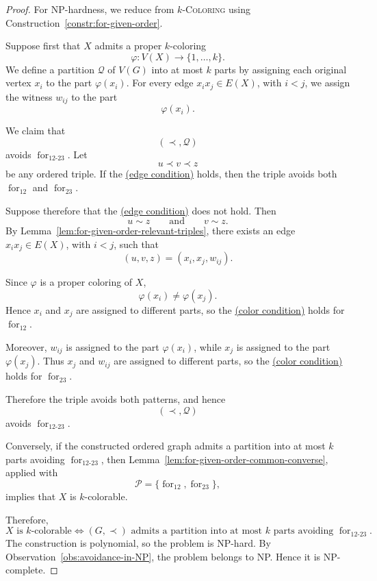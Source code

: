 \documentclass[12pt]{article}
\theoremstyle{plain}
\theoremstyle{definition}
\theoremstyle{remark}
\theoremstyle{definition}
\newcommand{\edgecondition}{%
  \hyperref[def:avoid:cond:edge]{(edge condition)}\xspace
}
\newcommand{\colorcondition}{%
  \hyperref[def:avoid:cond:color]{(color condition)}\xspace
}
\newcommand{\forlabel}{\mathrm{for}}
\DeclareRobustCommand{\forparam}[1]{%
  \ensuremath{\mathop{\forlabel}\nolimits_{#1}}%
}
\begin{document}
\begin{proof}
For NP-hardness, we reduce from \(k\)-\textsc{Coloring} using
Construction~\ref{constr:for-given-order}.

Suppose first that \(X\) admits a proper \(k\)-coloring
\[
\varphi:V(X)\to\{1,\dots,k\}.
\]
We define a partition \(\mathcal Q\) of \(V(G)\) into at most \(k\)
parts by assigning each original vertex \(x_i\) to the part
\(\varphi(x_i)\). For every edge \(x_ix_j\in E(X)\), with \(i<j\),
we assign the witness \(w_{ij}\) to the part
\[
\varphi(x_i).
\]

We claim that
\[
(\prec,\mathcal Q)
\]
avoids \(\forparam{12\text{-}23}\). Let
\[
u\prec v\prec z
\]
be any ordered triple. If the \edgecondition{} holds, then the triple
avoids both \(\forparam{12}\) and \(\forparam{23}\).

Suppose therefore that the \edgecondition{} does not hold. Then
\[
u\sim z
\qquad\text{and}\qquad
v\sim z.
\]
By Lemma~\ref{lem:for-given-order-relevant-triples}, there exists an
edge \(x_ix_j\in E(X)\), with \(i<j\), such that
\[
(u,v,z)=(x_i,x_j,w_{ij}).
\]

Since \(\varphi\) is a proper coloring of \(X\),
\[
\varphi(x_i)\neq\varphi(x_j).
\]
Hence \(x_i\) and \(x_j\) are assigned to different parts, so the
\colorcondition{} holds for \(\forparam{12}\).

Moreover, \(w_{ij}\) is assigned to the part \(\varphi(x_i)\), while
\(x_j\) is assigned to the part \(\varphi(x_j)\). Thus \(x_j\) and
\(w_{ij}\) are assigned to different parts, so the \colorcondition{}
holds for \(\forparam{23}\).

Therefore the triple avoids both patterns, and hence
\[
(\prec,\mathcal Q)
\]
avoids \(\forparam{12\text{-}23}\).

Conversely, if the constructed ordered graph admits a partition into
at most \(k\) parts avoiding \(\forparam{12\text{-}23}\), then
Lemma~\ref{lem:for-given-order-common-converse}, applied with
\[
\mathcal P=\{\forparam{12},\forparam{23}\},
\]
implies that \(X\) is \(k\)-colorable.

Therefore,
\[
X\text{ is \(k\)-colorable}
\iff
(G,\prec)\text{ admits a partition into at most \(k\) parts avoiding }
\forparam{12\text{-}23}.
\]
The construction is polynomial, so the problem is NP-hard.
By Observation~\ref{obs:avoidance-in-NP}, the problem belongs to NP.
Hence it is NP-complete.
\end{proof}
\end{document}
